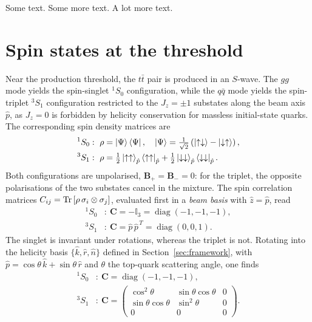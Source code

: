 \documentclass[aps,prd,twocolumn,floatfix,superscriptaddress,longbibliography,10pt]{revtex4-2}
\DeclareMathOperator{\diag}{diag}
\newcommand{\unitmat}[1]{\ensuremath{\mathbb{I}_{#1}}\xspace}
\newcommand{\singlet}{\ensuremath{^{1}S_0}\xspace}
\newcommand{\triplet}{\ensuremath{^{3}S_1}\xspace}
\newcommand{\ttbar}{{\ensuremath{t\bar{t}}}\xspace}
\begin{document}
Some text. Some more text. A lot more text.




\appendix

\section{Spin states at the threshold}
\label{app:threshold}

Near the production threshold, the \ttbar pair is produced in an $S$-wave.
The $gg$ mode yields the spin-singlet \singlet configuration, while the
$q\bar{q}$ mode yields the spin-triplet \triplet configuration restricted to
the $J_z=\pm1$ substates along the beam axis $\hat{p}$, as $J_z=0$ is
forbidden by helicity conservation for massless initial-state quarks.
The corresponding spin density matrices are
\begin{align}
  \singlet &: \ \rho = \ket{\Psi}\bra{\Psi},
  \quad \ket{\Psi} = \tfrac{1}{\sqrt{2}}
    \left(\ket{\uparrow\downarrow}
        - \ket{\downarrow\uparrow}\right), \\
  \triplet &: \ \rho =
    \tfrac{1}{2}\ket{\uparrow\uparrow}_{\hat{p}}\bra{\uparrow\uparrow}_{\hat{p}}
  + \tfrac{1}{2}\ket{\downarrow\downarrow}_{\hat{p}}\bra{\downarrow\downarrow}_{\hat{p}}.
\end{align}
Both configurations are unpolarised, $\mathbf{B}_{+}=\mathbf{B}_{-}=0$: for
the triplet, the opposite polarisations of the two substates cancel in the
mixture.
The spin correlation matrices
$C_{ij} = \Tr\left[\rho\,\sigma_i\otimes\sigma_j\right]$, evaluated first in
a \emph{beam basis} with $\hat{z}=\hat{p}$, read
\begin{align}
  \singlet &: \ \mathbf{C} = -\unitmat{3} = \diag(-1,-1,-1), \\
  \triplet &: \ \mathbf{C} = \hat{p}\,\hat{p}^{\,T} = \diag(0,0,1).
\end{align}
The singlet is invariant under rotations, whereas the triplet is not.
Rotating into the helicity basis $\{\hat{k},\hat{r},\hat{n}\}$ defined in
Section~\ref{sec:framework}, with
$\hat{p} = \cos\theta\,\hat{k} + \sin\theta\,\hat{r}$ and $\theta$ the
top-quark scattering angle, one finds
\begin{align}
  \singlet &: \ \mathbf{C} = \diag(-1,-1,-1), \\
  \triplet &: \ \mathbf{C} =
  \begin{pmatrix}
    \cos^2\theta & \sin\theta\cos\theta & 0 \\
    \sin\theta\cos\theta & \sin^2\theta & 0 \\
    0 & 0 & 0
  \end{pmatrix}.
\end{align}
\end{document}
